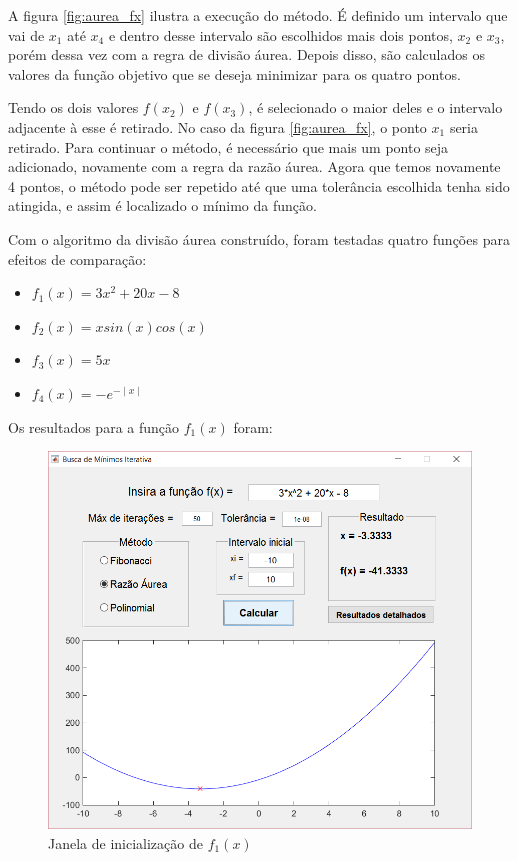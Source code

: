 A figura \ref{fig:aurea_fx} ilustra a execução do método. É definido um intervalo que vai de $ x_1 $ até $ x_4 $ e dentro desse intervalo são escolhidos mais dois pontos, $ x_2 $ e $ x_3 $, porém dessa vez com a regra de divisão áurea. Depois disso, são calculados os valores da função objetivo que se deseja minimizar para os quatro pontos.

Tendo os dois valores $ f(x_2) $ e $ f(x_3) $, é selecionado o maior deles e o intervalo adjacente à esse é retirado. No caso da figura \ref{fig:aurea_fx}, o ponto $ x_1 $ seria retirado. Para continuar o método, é necessário que mais um ponto seja adicionado, novamente com a regra da razão áurea. Agora que temos novamente 4 pontos, o método pode ser repetido até que uma tolerância escolhida tenha sido atingida, e assim é localizado o mínimo da função.

Com o algoritmo da divisão áurea construído, foram testadas quatro funções para efeitos de comparação:

\begin{itemize}
	\item $ f_1(x) = 3x^2 + 20x - 8 $
	\item $ f_2(x) = xsin(x)cos(x) $
	\item $ f_3(x) = 5x $
	\item $ f_4(x) = -e^{-\mid x \mid} $
\end{itemize}

\newpage

Os resultados para a função $ f_1(x) $ foram:

\begin{figure}[h]
	\begin{center}
		\includegraphics[width=14cm]{../aurea/f1_gui.png}   
		\caption{Janela de inicialização de $ f_1(x) $}
		\label{fig:f1_gui}
	\end{center}
\end{figure}

